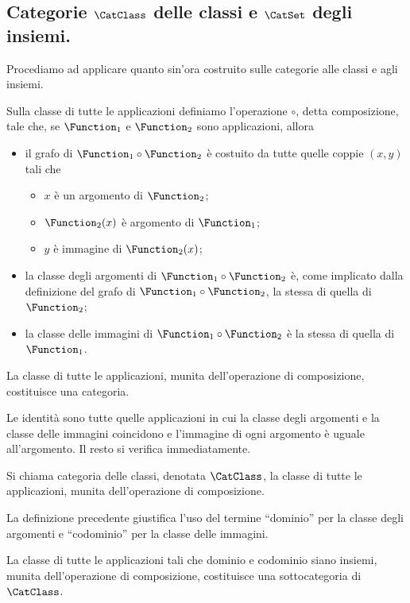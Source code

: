 \subsection{Categorie $\CatClass$ delle classi e $\CatSet$ degli insiemi.}\label{CategoriaDegliInsiemi}
\par Procediamo ad applicare quanto sin'ora costruito sulle categorie alle classi e agli insiemi.
\begin{Definition}
	Sulla classe di tutte le applicazioni definiamo l'operazione $\circ$, detta composizione, tale che, se $\Function_1$ e $\Function_2$ sono applicazioni, allora
	\begin{itemize}
		\item il grafo di $\Function_1 \circ \Function_2$ \`e costuito da tutte quelle coppie $(x,y)$ tali che
		\begin{itemize}
			\item $x$ \`e un argomento di $\Function_2$;
			\item $\Function_2(x)$ \`e argomento di $\Function_1$;
			\item $y$ \`e immagine di $\Function_2(x)$;
		\end{itemize}
		\item la classe degli argomenti di $\Function_1 \circ \Function_2$ \`e, come implicato dalla definizione del grafo di $\Function_1 \circ \Function_2$, la stessa di quella di $\Function_2$;
		\item la classe delle immagini di $\Function_1 \circ \Function_2$ \`e la stessa di quella di $\Function_1$.
	\end{itemize}
\end{Definition}
\begin{Theorem}
	La classe di tutte le applicazioni, munita dell'operazione di composizione, costituisce una categoria.
\end{Theorem}
\Proof Le identit\`a sono tutte quelle applicazioni in cui la classe degli argomenti e la classe delle immagini coincidono e l'immagine di ogni argomento \`e uguale all'argomento. Il resto si verifica immediatamente. \EndProof
\begin{Definition}
	Si chiama categoria delle classi, denotata $\CatClass$, la classe di tutte le applicazioni, munita dell'operazione di composizione.
\end{Definition}
\par La definizione precedente giustifica l'uso del termine ``dominio'' per la classe degli argomenti e ``codominio'' per la classe delle immagini.
\begin{Theorem}
	La classe di tutte le applicazioni tali che dominio e codominio siano insiemi, munita dell'operazione di composizione, costituisce una sottocategoria di $\CatClass$.
\end{Theorem}
